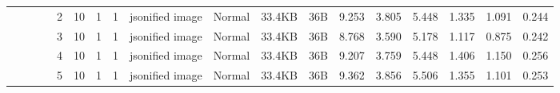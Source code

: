 \begin{landscape}
\begin{table}[]
{\begin{tabular}{@{}ccccllllllllllllll@{}}
                                                                                   &                              &                                &                                                                                                          & 2                                                     & 10                                       & 1                                          & 1                                 & jsonified image                  & Normal                             & 33.4KB                                        & 36B                                             & 9.253                   & 3.805    & 5.448                        & 1.335                   & 1.091    & 0.244                        \\
                                                                                   &                              &                                &                                                                                                          & 3                                                     & 10                                       & 1                                          & 1                                 & jsonified image                  & Normal                             & 33.4KB                                        & 36B                                             & 8.768                   & 3.590    & 5.178                        & 1.117                   & 0.875    & 0.242                        \\
                                                                                   &                              &                                &                                                                                                          & 4                                                     & 10                                       & 1                                          & 1                                 & jsonified image                  & Normal                             & 33.4KB                                        & 36B                                             & 9.207                   & 3.759    & 5.448                        & 1.406                   & 1.150    & 0.256                        \\
                                                                                   &                              &                                &                                                                                                          & 5                                                     & 10                                       & 1                                          & 1                                 & jsonified image                  & Normal                             & 33.4KB                                        & 36B                                             & 9.362                   & 3.856    & 5.506                        & 1.355                   & 1.101    & 0.253                        \\

\end{tabular}}
\end{table}
\end{landscape}
